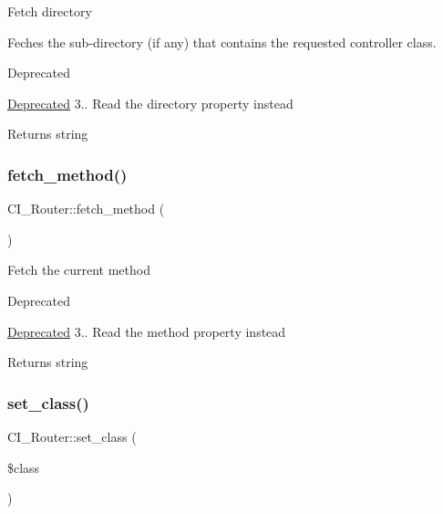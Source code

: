Fetch directory

Feches the sub-\/directory (if any) that contains the requested controller class.

\begin{DoxyRefDesc}{Deprecated}
\item[\mbox{\hyperlink{deprecated__deprecated000005}{Deprecated}}]3.. Read the \textquotesingle{}directory\textquotesingle{} property instead \end{DoxyRefDesc}
\begin{DoxyReturn}{Returns}
string 
\end{DoxyReturn}
\mbox{\label{class_c_i___router_a23db4d137e36fa933f3d0e674bd057ad}} 
\subsubsection{\texorpdfstring{fetch\+\_\+method()}{fetch\_method()}}
{\footnotesize\ttfamily C\+I\+\_\+\+Router\+::fetch\+\_\+method (\begin{DoxyParamCaption}{ }\end{DoxyParamCaption})}

Fetch the current method

\begin{DoxyRefDesc}{Deprecated}
\item[\mbox{\hyperlink{deprecated__deprecated000004}{Deprecated}}]3.. Read the \textquotesingle{}method\textquotesingle{} property instead \end{DoxyRefDesc}
\begin{DoxyReturn}{Returns}
string 
\end{DoxyReturn}
\mbox{\label{class_c_i___router_a4379dbff2fc2b00f520182b37b7fc24c}} 
\subsubsection{\texorpdfstring{set\+\_\+class()}{set\_class()}}
{\footnotesize\ttfamily C\+I\+\_\+\+Router\+::set\+\_\+class (\begin{DoxyParamCaption}\item[{}]{\$class }\end{DoxyParamCaption})}

